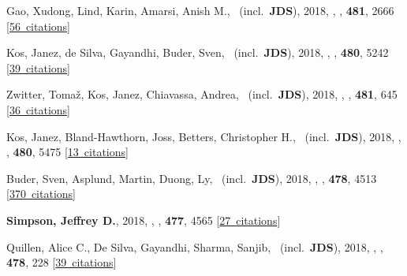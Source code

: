 \item[{\color{numcolor}\scriptsize23}] Gao, Xudong, Lind, Karin, Amarsi, Anish M., \etal\ (incl.\ \textbf{JDS}), 2018, , \mnras, \textbf{481}, 2666 [\href{https://ui.adsabs.harvard.edu/#abs/2018MNRAS.481.2666G}{56~citations}]

\item[{\color{numcolor}\scriptsize22}] Kos, Janez, de Silva, Gayandhi, Buder, Sven, \etal\ (incl.\ \textbf{JDS}), 2018, , \mnras, \textbf{480}, 5242 [\href{https://ui.adsabs.harvard.edu/#abs/2018MNRAS.480.5242K}{39~citations}]

\item[{\color{numcolor}\scriptsize21}] Zwitter, Toma{\v{z}}, Kos, Janez, Chiavassa, Andrea, \etal\ (incl.\ \textbf{JDS}), 2018, , \mnras, \textbf{481}, 645 [\href{https://ui.adsabs.harvard.edu/#abs/2018MNRAS.481..645Z}{36~citations}]

\item[{\color{numcolor}\scriptsize20}] Kos, Janez, Bland-Hawthorn, Joss, Betters, Christopher H., \etal\ (incl.\ \textbf{JDS}), 2018, , \mnras, \textbf{480}, 5475 [\href{https://ui.adsabs.harvard.edu/#abs/2018MNRAS.480.5475K}{13~citations}]

\item[{\color{numcolor}\scriptsize19}] Buder, Sven, Asplund, Martin, Duong, Ly, \etal\ (incl.\ \textbf{JDS}), 2018, , \mnras, \textbf{478}, 4513 [\href{https://ui.adsabs.harvard.edu/#abs/2018MNRAS.478.4513B}{370~citations}]

\item[{\color{numcolor}\scriptsize18}] \textbf{Simpson, Jeffrey D.}, 2018, , \mnras, \textbf{477}, 4565 [\href{https://ui.adsabs.harvard.edu/#abs/2018MNRAS.477.4565S}{27~citations}]

\item[{\color{numcolor}\scriptsize17}] Quillen, Alice C., De Silva, Gayandhi, Sharma, Sanjib, \etal\ (incl.\ \textbf{JDS}), 2018, , \mnras, \textbf{478}, 228 [\href{https://ui.adsabs.harvard.edu/#abs/2018MNRAS.478..228Q}{39~citations}]


